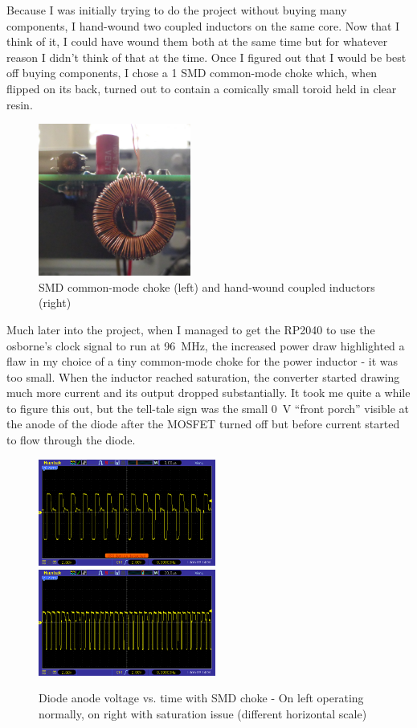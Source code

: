 \documentclass[a4paper]{article}
\begin{document}
Because I was initially trying to do the project without buying many
components, I hand-wound two coupled inductors on the same core. Now
that I think of it, I could have wound them both at the same time but
for whatever reason I didn't think of that at the time. Once I figured
out that I would be best off buying components, I chose a \qty{1}{\uH}
SMD common-mode choke which, when flipped on its back, turned out to
contain a comically small toroid held in clear resin.

\begin{figure}
  \centering
  \includegraphics[height=5cm]{inductors}
  \caption[Inductors]{SMD common-mode choke (left) and hand-wound
    coupled inductors (right)}
\end{figure}


Much later into the project, when I managed to get the RP2040 to use
the osborne's clock signal to run at \qty{96}{\MHz}, the increased
power draw highlighted a flaw in my choice of a tiny common-mode choke
for the power inductor - it was too small. When the inductor reached
saturation, the converter started drawing much more current and its
output dropped substantially. It took me quite a while to figure this
out, but the tell-tale sign was the small \qty{0}{\V} ``front porch''
visible at the anode of the diode after the MOSFET turned off but
before current started to flow through the diode.

\begin{figure}
  \centering
  \includegraphics[height=3.5cm]{pic_23_3}\hfill\includegraphics[height=3.5cm]{pic_23_4}
  \caption[Voltage traces with SMD choke]{Diode anode voltage
    vs. time with SMD choke - On left operating normally, on right
    with saturation issue (different horizontal scale)}
\end{figure}
\end{document}
